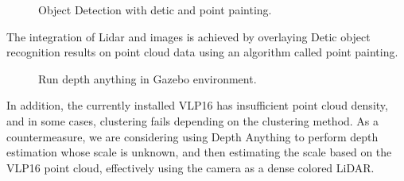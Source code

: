 \documentclass[lettersize,journal]{IEEEtran}
\begin{document}
\begin{figure}[H]
  \begin{center}
  \end{center}
  \caption{Object Detection with detic and point painting.}
  \label{fig:arch_nav}
\end{figure}

The integration of Lidar and images is achieved by overlaying Detic object recognition results on point cloud data using an algorithm called point painting.

\begin{figure}[H]
  \begin{center}
  \end{center}
  \caption{Run depth anything in Gazebo environment.}
  \label{fig:arch_nav}
\end{figure}

In addition, the currently installed VLP16 has insufficient point cloud density, and in some cases, clustering fails depending on the clustering method.
As a countermeasure, we are considering using Depth Anything to perform depth estimation whose scale is unknown, and then estimating the scale based on the VLP16 point cloud, effectively using the camera as a dense colored LiDAR.
\end{document}
